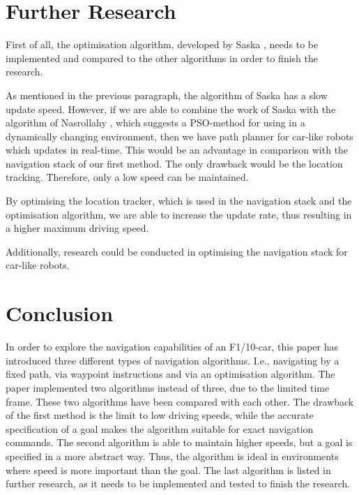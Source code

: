 \documentclass[conference,a4paper]{IEEEtran}
\begin{document}
\section{Further Research}
\label{sec:FurtherResearch}
First of all, the optimisation algorithm, developed by Saska \cite{Saska2006}, needs to be implemented and compared to the other algorithms in order to finish the research. 

As mentioned in the previous paragraph, the algorithm of Saska has a slow update speed. However, if we are able to combine the work of Saska with the algorithm of Nasrollahy \cite{Nasrollahy2009}, which suggests a PSO-method for using in a dynamically changing environment, then we have path planner for car-like robots which updates in real-time. This would be an advantage in comparison with the navigation stack of our first method. The only drawback would be the location tracking. Therefore, only a low speed can be maintained. 

By optimising the location tracker, which is used in the navigation stack and the optimisation algorithm, we are able to increase the update rate, thus resulting in a higher maximum driving speed.

Additionally, research could be conducted in optimising the navigation stack for car-like robots. 

\section{Conclusion}
\label{sec:Conclusion}
In order to explore the navigation capabilities of an F1/10-car, this paper has introduced three different types of navigation algorithms. I.e., navigating by a fixed path, via waypoint instructions and via an optimisation algorithm. The paper implemented two algorithms instead of three, due to the limited time frame. These two algorithms have been compared with each other. The drawback of the first method is the limit to low driving speeds, while the accurate specification of a goal makes the algorithm suitable for exact navigation commands. The second algorithm is able to maintain higher speeds, but a goal is specified in a more abstract way. Thus, the algorithm is ideal in environments where speed is more important than the goal.
The last algorithm is listed in further research, as it needs to be implemented and tested to finish the research.


\end{document}
